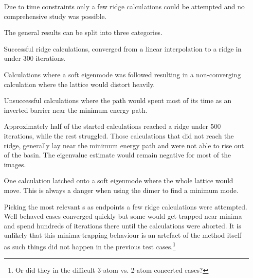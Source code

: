 Due to time constraints only a few ridge calculations could be attempted and no comprehensive study was possible.
\expand

The general results can be split into three categories.
\bit
\item Successful ridge calculations, converged from a linear interpolation to a ridge in under 300 iterations.
\item Calculations where a soft eigenmode was followed resulting in a non-converging calculation where the lattice would distort heavily.
\item Unsuccessful calculations where the path would spent most of its time as an inverted barrier near the minimum energy path.
\eit


Approximately half of the started calculations reached a ridge under 500 iterations, while the rest struggled.
Those calculations that did not reach the ridge, generally lay near the minimum energy path and were not able to rise out of the basin.
The eigenvalue estimate would remain negative for most of the images.

One calculation latched onto a soft eigenmode where the whole lattice would move.
This is always a danger when using the dimer to find a minimum mode.

Picking the most relevant s as endpoints a few ridge calculations were attempted.
Well behaved cases converged quickly but some would get trapped near minima and spend hundreds of iterations there until the calculations were aborted.
It is unlikely that this minima-trapping behaviour is an artefact of the method itself as such things did not happen in the previous test cases.\footnote{Or did they in the difficult 3-atom vs. 2-atom concerted cases?}



